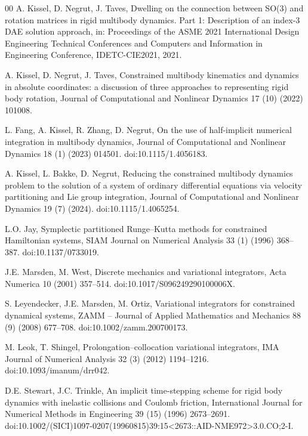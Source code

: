 \documentclass[preprint,12pt]{elsarticle}
\begin{document}
\begin{thebibliography}{00}
A. Kissel, D. Negrut, J. Taves,
Dwelling on the connection between SO(3) and rotation matrices in rigid
multibody dynamics. Part 1: Description of an index-3 DAE solution approach,
in: Proceedings of the ASME 2021 International Design Engineering Technical
Conferences and Computers and Information in Engineering Conference,
IDETC-CIE2021, 2021.

A. Kissel, D. Negrut, J. Taves,
Constrained multibody kinematics and dynamics in absolute coordinates: a
discussion of three approaches to representing rigid body rotation,
Journal of Computational and Nonlinear Dynamics 17 (10) (2022) 101008.

L. Fang, A. Kissel, R. Zhang, D. Negrut,
On the use of half-implicit numerical integration in multibody dynamics,
Journal of Computational and Nonlinear Dynamics 18 (1) (2023) 014501.
doi:10.1115/1.4056183.

A. Kissel, L. Bakke, D. Negrut,
Reducing the constrained multibody dynamics problem to the solution of a
system of ordinary differential equations via velocity partitioning and Lie
group integration,
Journal of Computational and Nonlinear Dynamics 19 (7) (2024).
doi:10.1115/1.4065254.

L.O. Jay,
Symplectic partitioned Runge--Kutta methods for constrained Hamiltonian
systems,
SIAM Journal on Numerical Analysis 33 (1) (1996) 368--387.
doi:10.1137/0733019.

J.E. Marsden, M. West,
Discrete mechanics and variational integrators,
Acta Numerica 10 (2001) 357--514.
doi:10.1017/S096249290100006X.

S. Leyendecker, J.E. Marsden, M. Ortiz,
Variational integrators for constrained dynamical systems,
ZAMM -- Journal of Applied Mathematics and Mechanics 88 (9) (2008) 677--708.
doi:10.1002/zamm.200700173.

M. Leok, T. Shingel,
Prolongation--collocation variational integrators,
IMA Journal of Numerical Analysis 32 (3) (2012) 1194--1216.
doi:10.1093/imanum/drr042.

D.E. Stewart, J.C. Trinkle,
An implicit time-stepping scheme for rigid body dynamics with inelastic
collisions and Coulomb friction,
International Journal for Numerical Methods in Engineering 39 (15) (1996)
2673--2691.
doi:10.1002/(SICI)1097-0207(19960815)39:15<2673::AID-NME972>3.0.CO;2-I.


\end{thebibliography}
\end{document}
